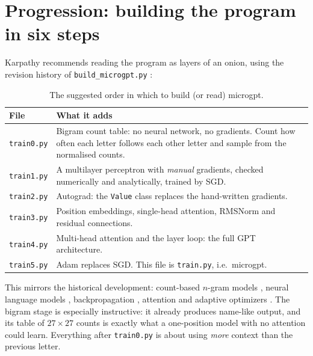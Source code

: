 \documentclass[11pt,letterpaper]{article}
\theoremstyle{remark}
\newcommand{\code}[1]{\lstinline[basicstyle=\ttfamily\small]|#1|}
\begin{document}
\section{Progression: building the program in six steps}

Karpathy recommends reading the program as layers of an onion, using the revision history of \texttt{build\_microgpt.py} \parencite{karpathy2026buildmicrogpt}:

\begin{table}[h]
\centering\small
\begin{tabularx}{\textwidth}{@{}lX@{}}
\toprule
File & What it adds \\
\midrule
\texttt{train0.py} & Bigram count table: no neural network, no gradients. Count how often each letter follows each other letter and sample from the normalised counts. \\
\texttt{train1.py} & A multilayer perceptron with \emph{manual} gradients, checked numerically and analytically, trained by SGD. \\
\texttt{train2.py} & Autograd: the \code{Value} class replaces the hand-written gradients. \\
\texttt{train3.py} & Position embeddings, single-head attention, RMSNorm and residual connections. \\
\texttt{train4.py} & Multi-head attention and the layer loop: the full GPT architecture. \\
\texttt{train5.py} & Adam replaces SGD. This file is \texttt{train.py}, i.e.\ microgpt. \\
\bottomrule
\end{tabularx}
\caption{The suggested order in which to build (or read) microgpt.}
\end{table}

This mirrors the historical development: count-based $n$-gram models \parencite{shannon1951prediction,jurafsky2025slp}, neural language models \parencite{bengio2003neural}, backpropagation \parencite{rumelhart1986learning}, attention \parencite{bahdanau2015attention,vaswani2017attention} and adaptive optimizers \parencite{kingma2015adam}. The bigram stage is especially instructive: it already produces name-like output, and its table of $27\times 27$ counts is exactly what a one-position model with no attention could learn. Everything after \texttt{train0.py} is about using \emph{more} context than the previous letter.
\end{document}
